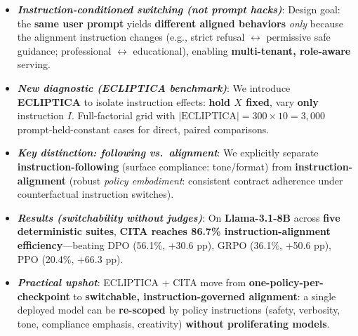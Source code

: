 \documentclass{article}
\begin{document}
\begin{defin}
\begin{itemize}[left=-4pt,itemsep=0pt,topsep=0pt,parsep=0pt]
\item[\faRandom] \textbf{\textit{Instruction-conditioned switching (not prompt hacks)}}:
Design goal: the \textbf{same user prompt} yields \textbf{different aligned behaviors} \emph{only} because the alignment instruction changes
(e.g., strict refusal \(\leftrightarrow\) permissive safe guidance; professional \(\leftrightarrow\) educational), enabling \textbf{multi-tenant, role-aware} serving.

\item[\faVial] \textbf{\textit{New diagnostic (ECLIPTICA benchmark)}}:
We introduce \textbf{ECLIPTICA} to isolate instruction effects:
\textbf{hold \(X\) fixed}, vary \textbf{only} instruction \(I\).
Full-factorial grid with \(\lvert\text{ECLIPTICA}\rvert = 300 \times 10 = 3{,}000\) prompt-held-constant cases for direct, paired comparisons.

\item[\faBalanceScale] \textbf{\textit{Key distinction: following vs.\ alignment}}:
We explicitly separate \textbf{instruction-following} (surface compliance: tone/format)
from \textbf{instruction-alignment} (robust \emph{policy embodiment}: consistent contract adherence under counterfactual instruction switches).

\item[\faChartLine] \textbf{\textit{Results (switchability without judges)}}:
On \textbf{Llama-3.1-8B} across \textbf{five deterministic suites},
\textbf{CITA reaches \colorbox{bg-green}{86.7\%} instruction-alignment efficiency}—beating DPO (56.1\%, +30.6 pp), GRPO (36.1\%, +50.6 pp), PPO (20.4\%, +66.3 pp).

\item[\faTools] \textbf{\textit{Practical upshot}}:
ECLIPTICA + CITA move from \textbf{one-policy-per-checkpoint} to \textbf{switchable, instruction-governed alignment}:
a single deployed model can be \textbf{re-scoped} by policy instructions (safety, verbosity, tone, compliance emphasis, creativity) \textbf{without proliferating models}.




\end{itemize}
\vspace{-2mm}
\end{defin}
\end{document}
